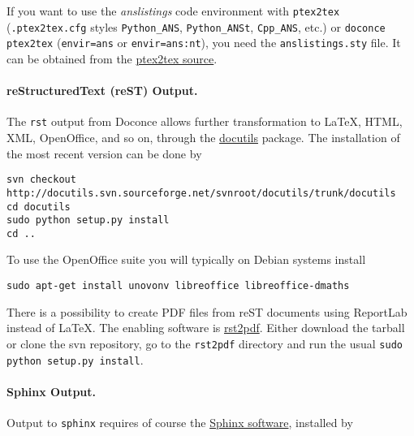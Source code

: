 \documentclass[%
oneside,                 %
final,                   %
10pt]{article}
\begin{document}
If you want to use the \emph{anslistings} code environment with {\fontsize{10pt}{10pt}\Verb!ptex2tex!}
({\fontsize{10pt}{10pt}\Verb!.ptex2tex.cfg!} styles {\fontsize{10pt}{10pt}\Verb!Python_ANS!}, {\fontsize{10pt}{10pt}\Verb!Python_ANSt!}, {\fontsize{10pt}{10pt}\Verb!Cpp_ANS!}, etc.) or
{\fontsize{10pt}{10pt}\Verb!doconce ptex2tex!} ({\fontsize{10pt}{10pt}\Verb!envir=ans!} or {\fontsize{10pt}{10pt}\Verb!envir=ans:nt!}), you need the
{\fontsize{10pt}{10pt}\Verb!anslistings.sty!} file. It can be obtained from
the \href{{https://code.google.com/p/ptex2tex/source/browse/trunk/latex/styles/with_license/anslistings.sty}}{ptex2tex source}.


\paragraph{reStructuredText (reST) Output.}
The {\fontsize{10pt}{10pt}\Verb!rst!} output from Doconce allows further transformation to {\LaTeX},
HTML, XML, OpenOffice, and so on, through the \href{{http://docutils.sourceforge.net}}{docutils} package.  The installation of the
most recent version can be done by

\vspace{4pt}
\begin{Verbatim}[numbers=none,frame=lines,label=\fbox{{\tiny Terminal}},fontsize=\fontsize{9pt}{9pt},
labelposition=topline,framesep=2.5mm,framerule=0.7pt]
svn checkout http://docutils.svn.sourceforge.net/svnroot/docutils/trunk/docutils
cd docutils
sudo python setup.py install
cd ..
\end{Verbatim}
To use the OpenOffice suite you will typically on Debian systems install
\vspace{4pt}
\begin{Verbatim}[numbers=none,frame=lines,label=\fbox{{\tiny Terminal}},fontsize=\fontsize{9pt}{9pt},
labelposition=topline,framesep=2.5mm,framerule=0.7pt]
sudo apt-get install unovonv libreoffice libreoffice-dmaths
\end{Verbatim}

There is a possibility to create PDF files from reST documents
using ReportLab instead of {\LaTeX}. The enabling software is
\href{{http://code.google.com/p/rst2pdf}}{rst2pdf}. Either download the tarball
or clone the svn repository, go to the {\fontsize{10pt}{10pt}\Verb!rst2pdf!} directory and
run the usual {\fontsize{10pt}{10pt}\Verb!sudo python setup.py install!}.

\paragraph{Sphinx Output.}
Output to {\fontsize{10pt}{10pt}\Verb!sphinx!} requires of course the
\href{{http://sphinx.pocoo.org}}{Sphinx software},
installed by
\end{document}
